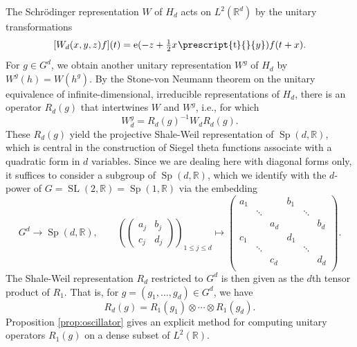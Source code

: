 \documentclass[12pt]{amsart}
\theoremstyle{definition}
\theoremstyle{remark}
\numberwithin{equation}{section}
\newcommand{\R}{\mathbb{R}}
\newcommand{\e}{\mathrm{e}}
\newcommand{\SL}{\operatorname{SL}}
\newcommand{\Sp}{\operatorname{Sp}}
\newcommand*{\transp}[2][-1mu]{\ensuremath{\mskip1mu\prescript{\smash{\mathrm t\mkern#1}}{}{\mathstrut#2}}}
\begin{document}
The Schr\"odinger representation $W$ of $H_d$ acts on $L^2(\R^d)$ by the unitary transformations
\begin{equation}
  \label{eq:Schrodingerdef}
  [W_d(x, y, z)f](t) = \e(-z + \tfrac{1}{2} x\transp{y}) f(t + x).
\end{equation}
For $g \in G^d$, we obtain another unitary representation $W^g$ of $H_d$ by $W^g(h) = W(h^g)$. By the Stone-von Neumann theorem on the unitary equivalence of infinite-dimensional, irreducible representations of $H_d$, there is an operator $R_d(g)$ that intertwines $W$ and $W^g$, i.e., for which
\begin{equation}
  \label{eq:Rintertwine}
  W_d^g = R_d(g)^{-1} W_d R_d(g) .
\end{equation}
These $R_d(g)$ yield the projective Shale-Weil representation of $\Sp(d,\R)$, which is central in the construction of Siegel theta functions associate with a quadratic form in $d$ variables. Since we are dealing here with diagonal forms only, it suffices to consider a subgroup of $\Sp(d, \R)$, which we identify with the $d$-power of $G=\SL(2,\R)=\Sp(1,\R)$ via the embedding
\begin{equation}
  \label{eq:gembed}
  G^d \to \Sp(d,\R),\qquad 
  \left(
  \begin{pmatrix}
    a_j & b_j \\
    c_j & d_j 
  \end{pmatrix}
  \right)_{1\leq j \leq d} \mapsto
  \begin{pmatrix}
    a_1 &  & & b_1 & &  \\
        & \ddots & & & \ddots & \\
        & & a_d & & & b_d \\
    c_1 &  & & d_1 & &  \\
        & \ddots & & & \ddots & \\
        & & c_d & & & d_d \\
  \end{pmatrix}
  .
\end{equation}
The Shale-Weil representation $R_d$ restricted to $G^d$ is then given as the $d$th tensor product of $R_1$. That is, for $g = (g_1,\ldots,g_d) \in G^d$, we have
\begin{equation}
R_d(g) = R_1(g_1) \otimes \cdots \otimes R_1(g_d) . 
\end{equation}
Proposition \ref{prop:oscillator} gives an explicit method for computing unitary operators $R_1(g)$ on a dense subset of $L^2(\R)$.
\end{document}
